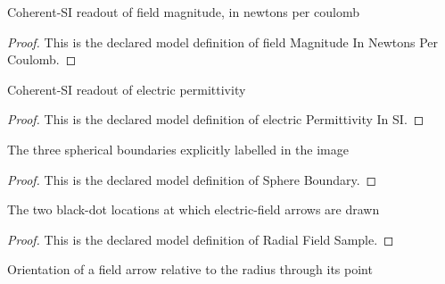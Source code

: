 \begin{definition}
  \label{def:physics:phyx-mini-0852:phyxminiproblems-problemphyxmini0852-fieldmagnitudeinnewtonspercoulomb}
  Coherent-SI readout of field magnitude, in newtons per coulomb
\end{definition}
\begin{proof}
  This is the declared model definition of field Magnitude In Newtons Per Coulomb.
\end{proof}
\begin{definition}
  \label{def:physics:phyx-mini-0852:phyxminiproblems-problemphyxmini0852-electricpermittivityinsi}
  Coherent-SI readout of electric permittivity
\end{definition}
\begin{proof}
  This is the declared model definition of electric Permittivity In SI.
\end{proof}
\begin{definition}
  \label{def:physics:phyx-mini-0852:phyxminiproblems-problemphyxmini0852-sphereboundary}
  The three spherical boundaries explicitly labelled in the image
\end{definition}
\begin{proof}
  This is the declared model definition of Sphere Boundary.
\end{proof}
\begin{definition}
  \label{def:physics:phyx-mini-0852:phyxminiproblems-problemphyxmini0852-radialfieldsample}
  The two black-dot locations at which electric-field arrows are drawn
\end{definition}
\begin{proof}
  This is the declared model definition of Radial Field Sample.
\end{proof}
\begin{definition}
  \label{def:physics:phyx-mini-0852:phyxminiproblems-problemphyxmini0852-radialarroworientation}
  Orientation of a field arrow relative to the radius through its point
\end{definition}
